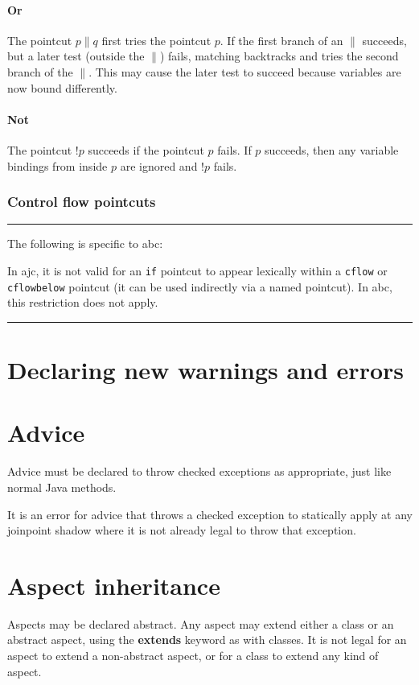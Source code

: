 \documentclass[12pt,a4paper]{report}
\newcommand\abcdistinctionbegin[0]{%
\hrule
\noindent
The following is specific to abc:

\noindent
}
\newcommand\abcdistinctionend[0]{%
\hrule
}
\def\ajor{\|}
\def\ajnot{!}
\begin{document}
\subsubsection{Or}

The pointcut $p\ajor q$ first tries the pointcut $p$.
If the first branch of an $\ajor$ succeeds, but a later test (outside 
the $\ajor$) fails,
matching backtracks and tries the second branch of the $\ajor$. This may
cause the later test to succeed because variables are now bound differently.

\subsubsection{Not}

The pointcut $\ajnot p$ succeeds if the pointcut $p$ fails. If $p$
succeeds, then any variable bindings from inside $p$ are ignored 
and $\ajnot p$ fails.

\subsection{Control flow pointcuts}

\abcdistinctionbegin
In ajc, it is not valid for an \verb|if| pointcut to appear lexically
within a \verb|cflow| or \verb|cflowbelow| pointcut (it can be used
indirectly via a named pointcut). In abc, this restriction does not apply.
\abcdistinctionend


\chapter{Declaring new warnings and errors}

\chapter{Advice}

Advice must be declared to throw checked exceptions as appropriate, just
like normal Java methods.

It is an error for advice that throws a checked exception
to statically apply at any joinpoint shadow where it is
not already legal to throw that exception.


\chapter{Aspect inheritance}
Aspects may be declared abstract. Any aspect may extend either a class
or an abstract aspect, using the {\bf extends} keyword as with classes.
It is not legal for an aspect to extend a non-abstract aspect, or
for a class to extend any kind of aspect.
\end{document}
